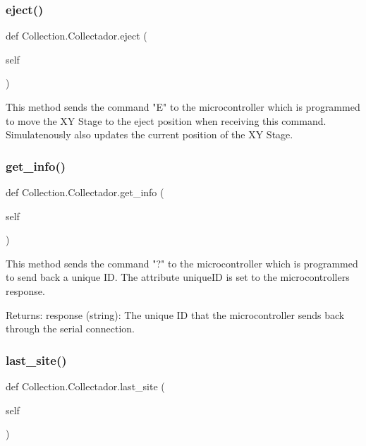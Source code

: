 \subsubsection{\texorpdfstring{eject()}{eject()}}
{\footnotesize\ttfamily def Collection.\+Collectador.\+eject (\begin{DoxyParamCaption}\item[{}]{self }\end{DoxyParamCaption})}

\begin{DoxyVerb}This method sends the command "E" to the microcontroller which is programmed to move the XY Stage to the eject position when receiving this command.
Simulatenously also updates the current position of the XY Stage.
\end{DoxyVerb}
 \mbox{\label{class_collection_1_1_collectador_a23757363741c6dd611d91dd984013d86}} 
\subsubsection{\texorpdfstring{get\_info()}{get\_info()}}
{\footnotesize\ttfamily def Collection.\+Collectador.\+get\+\_\+info (\begin{DoxyParamCaption}\item[{}]{self }\end{DoxyParamCaption})}

\begin{DoxyVerb}This method sends the command "?" to the microcontroller which is programmed to send back a unique ID.
The attribute uniqueID is set to the microcontrollers response.

Returns:
    response (string): The unique ID that the microcontroller sends back through the serial connection.
\end{DoxyVerb}
 \mbox{\label{class_collection_1_1_collectador_a784d44c359c9a4109ccd62b52a9a1e05}} 
\subsubsection{\texorpdfstring{last\_site()}{last\_site()}}
{\footnotesize\ttfamily def Collection.\+Collectador.\+last\+\_\+site (\begin{DoxyParamCaption}\item[{}]{self }\end{DoxyParamCaption})}

